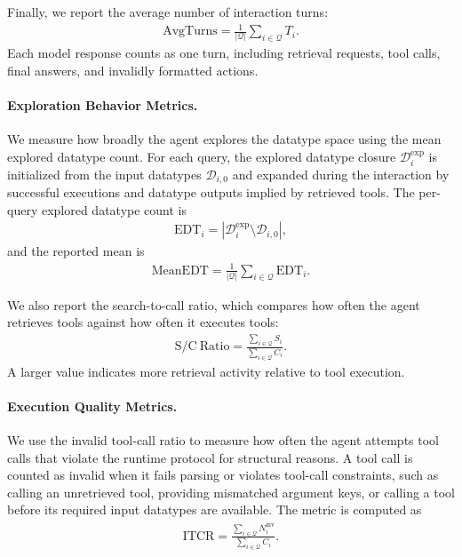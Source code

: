 \documentclass{llmxive}
\begin{document}
Finally, we report the average number of interaction turns:
\begin{equation}
\begin{aligned}
\mathrm{AvgTurns} = \frac{1}{|\mathcal{Q}|}\sum_{i \in \mathcal{Q}} T_i.
\end{aligned}
\end{equation}
Each model response counts as one turn, including retrieval requests, tool calls, final answers, and invalidly formatted actions.

\paragraph{Exploration Behavior Metrics.}
We measure how broadly the agent explores the datatype space using the mean explored datatype count. 
For each query, the explored datatype closure $\mathcal{D}_i^{\mathrm{exp}}$ is initialized from the input datatypes $\mathcal{D}_{i,0}$ and expanded during the interaction by successful executions and datatype outputs implied by retrieved tools. 
The per-query explored datatype count is
\begin{equation}
\begin{aligned}
\mathrm{EDT}_i = |\mathcal{D}_i^{\mathrm{exp}} \setminus \mathcal{D}_{i,0}|,
\end{aligned}
\end{equation}
and the reported mean is
\begin{equation}
\begin{aligned}
\mathrm{MeanEDT} = \frac{1}{|\mathcal{Q}|}\sum_{i \in \mathcal{Q}} \mathrm{EDT}_i.
\end{aligned}
\end{equation}

We also report the search-to-call ratio, which compares how often the agent retrieves tools against how often it executes tools:
\begin{equation}
\begin{aligned}
\mathrm{S/C\ Ratio} = \frac{\sum_{i \in \mathcal{Q}} S_i}{\sum_{i \in \mathcal{Q}} C_i}.
\end{aligned}
\end{equation}
A larger value indicates more retrieval activity relative to tool execution.

\paragraph{Execution Quality Metrics.}
We use the invalid tool-call ratio to measure how often the agent attempts tool calls that violate the runtime protocol for structural reasons.
A tool call is counted as invalid when it fails parsing or violates tool-call constraints, such as calling an unretrieved tool, providing mismatched argument keys, or calling a tool before its required input datatypes are available.
The metric is computed as
\begin{equation}
\begin{aligned}
\mathrm{ITCR} = \frac{\sum_{i \in \mathcal{Q}} N_i^{\mathrm{inv}}}{\sum_{i \in \mathcal{Q}} C_i}.
\end{aligned}
\end{equation}
\end{document}
